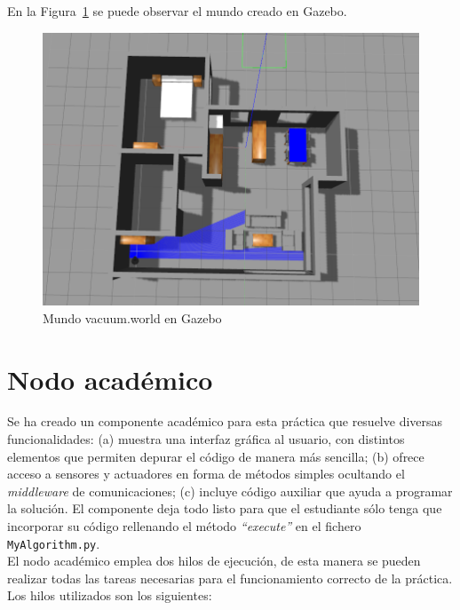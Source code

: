 En la Figura~\ref{fig.vacuumWorld} se puede observar el mundo creado en Gazebo.

\begin{figure}[H]
  \begin{center}
    \includegraphics[width=1.0\textwidth]{figures/Vacuum/vacuumWorld.png}
		\caption{Mundo vacuum.world en Gazebo}
		\label{fig.vacuumWorld}
		\end{center}
\end{figure}


\section{Nodo académico}
Se ha creado un componente académico para esta práctica que resuelve diversas funcionalidades: (a) muestra una interfaz gráfica al usuario, con distintos elementos que permiten depurar el código de manera más sencilla; (b) ofrece acceso a sensores y actuadores en forma de métodos simples ocultando el \textit{middleware} de comunicaciones; (c) incluye código auxiliar que ayuda a programar la solución. El componente deja todo listo para que el estudiante sólo tenga que incorporar su código rellenando el método \textit{``execute''} en el fichero \texttt{MyAlgorithm.py}.\\

El nodo académico emplea dos hilos de ejecución, de esta manera se pueden realizar todas las tareas necesarias para el funcionamiento correcto de la práctica. Los hilos utilizados son los siguientes:


